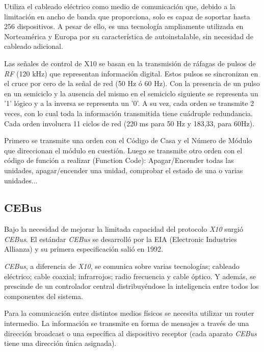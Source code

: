 
Utiliza el cableado eléctrico como medio de comunicación que, debido a la limitación en ancho de banda que proporciona, solo es capaz de soportar hasta 256 dispositivos. A pesar de ello, es una tecnología ampliamente utilizada en Norteamérica y Europa por su característica de autoinstalable, sin necesidad de cableado adicional.

Las señales de control de X10 se basan en la transmisión de ráfagas de pulsos de \emph{RF} (120 kHz) que representan información digital. Estos pulsos se sincronizan en el cruce por cero de la señal de red (50 Hz ó 60 Hz). Con la presencia de un pulso en un semiciclo y la ausencia del mismo en el semiciclo siguiente se representa un '1' lógico y a la inversa se representa un '0'. A su vez, cada orden se transmite 2 veces, con lo cual toda la información transmitida tiene cuádruple redundancia. Cada orden involucra 11 ciclos de red (220 ms para 50 Hz y 183,33, para 60Hz).

Primero se transmite una orden con el Código de Casa y el Número de Módulo que direccionan el módulo en cuestión. Luego se transmite otro orden con el código de función a realizar (Function Code): Apagar/Encender todas las unidades, apagar/encender una unidad, comprobar el estado de una o varias unidades...

\subsection{CEBus}

Bajo la necesidad de mejorar la limitada capacidad del protocolo \emph{X10} surgió \emph{CEBus}. El estándar \emph{CEBus} se desarrolló por la EIA (Electronic Industries Allianza) y su primera especificación salió en 1992.

\emph{CEBus}, a diferencia de \emph{X10}, se comunica sobre varias tecnologías; cableado eléctrico; cable coaxial; infrarrojos; radio frecuencia y cable óptico. Y además, se prescinde de un controlador central distribuyéndose la inteligencia entre todos los componentes del sistema.

Para la comunicación entre distintos medios físicos se necesita utilizar un router intermedio. La información se transmite en forma de mensajes a través de una dirección broadcast o una específica al dispositivo receptor (cada aparato \emph{CEBus} tiene una dirección única asignada).

